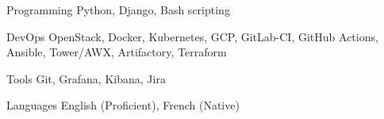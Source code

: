 

\begin{cvskills}

  \cvskill
    {Programming} %
    {Python, Django, Bash scripting} %

\begin{comment}
  \cvskill
    {Cloud} %
    {OpenStack, Docker, Kubernetes, GCP} %
\end{comment}
  \cvskill
    {DevOps} %
    {OpenStack, Docker, Kubernetes, GCP, GitLab-CI, GitHub Actions, Ansible, Tower/AWX, Artifactory, Terraform} %

  \cvskill
    {Tools} %
    {Git, Grafana, Kibana, Jira} %

  \cvskill
    {Languages} %
    {English (Proficient), French (Native)} %

\end{cvskills}
